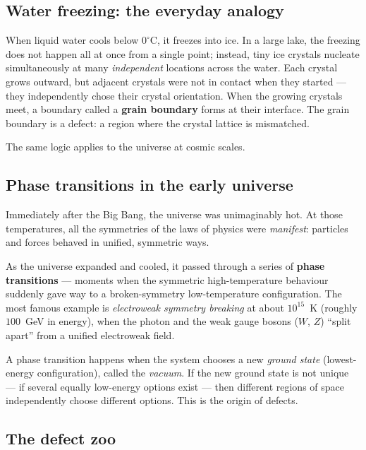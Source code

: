 \documentclass[11pt,a4paper]{article}
\newcommand{\term}[1]{\textbf{#1}}
\begin{document}
\subsection{Water freezing: the everyday analogy}

When liquid water cools below $0^\circ$C, it freezes into ice.
In a large lake, the freezing does not happen all at once from a single point;
instead, tiny ice crystals nucleate simultaneously at many \emph{independent}
locations across the water.
Each crystal grows outward, but adjacent crystals were not in contact when they
started --- they independently chose their crystal orientation.
When the growing crystals meet, a boundary called a \term{grain boundary}
forms at their interface.
The grain boundary is a defect: a region where the crystal lattice is mismatched.

\medskip
\noindent
The same logic applies to the universe at cosmic scales.

\subsection{Phase transitions in the early universe}

Immediately after the Big Bang, the universe was unimaginably hot.
At those temperatures, all the symmetries of the laws of physics were
\emph{manifest}: particles and forces behaved in unified, symmetric ways.

As the universe expanded and cooled, it passed through a series of
\term{phase transitions} --- moments when the symmetric high-temperature
behaviour suddenly gave way to a broken-symmetry low-temperature configuration.
The most famous example is \emph{electroweak symmetry breaking} at about
$10^{15}$~K (roughly $100$~GeV in energy), when the photon and the weak gauge
bosons ($W$, $Z$) ``split apart'' from a unified electroweak field.

\begin{tcolorbox}[colback=boxorange,colframe=orange!60!black,title=Key idea: vacuum selection]
A phase transition happens when the system chooses a new \emph{ground state}
(lowest-energy configuration), called the \emph{vacuum}.
If the new ground state is not unique --- if several equally low-energy options
exist --- then different regions of space independently choose different options.
This is the origin of defects.
\end{tcolorbox}

\subsection{The defect zoo}
\end{document}
